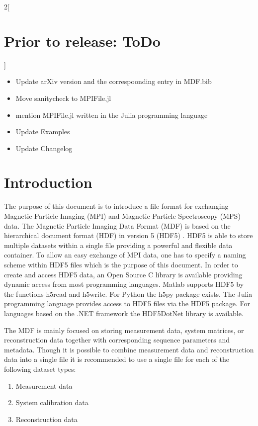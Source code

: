 \documentclass[landscape,a4paper]{article} %
\newcommand{\inlvar}[1]{{\ttfamily#1}}
\begin{document}
\begin{multicols}{2}[\section{Prior to release: ToDo}]		
 \begin{itemize}		
 	\item Update arXiv version and the correspoonding entry in \inlvar{MDF.bib}		
 	\item Move sanitycheck to \inlvar{MPIFile.jl}		
 	\item mention MPIFile.jl written in the Julia programming language \cite{Bezanson2012,Bezanson2014,Bezanson2014a}		
 	\item Update Examples		
 	\item Update Changelog		
 \end{itemize}		


\section{Introduction} \label{Sec:Introduction}

The purpose of this document is to introduce a file format for exchanging Magnetic Particle Imaging (MPI) and Magnetic Particle Spectroscopy (MPS) data. The Magnetic Particle Imaging Data Format (MDF) is based on the hierarchical document format (HDF) in version 5 (HDF5) \cite{hdf5}. HDF5 is able to store multiple datasets within a single file providing a powerful and flexible data container. To allow an easy exchange of MPI data, one has to specify a naming scheme within HDF5 files which is the purpose of this document. In order to create and access HDF5 data, an Open Source C library is available providing dynamic access from most programming languages. Matlab supports HDF5 by the functions \inlvar{h5read} and \inlvar{h5write}. For Python the \inlvar{h5py} package exists. The Julia programming language provides access to HDF5 files via the \inlvar{HDF5} package. For languages based on the .NET framework the \inlvar{HDF5DotNet} library is available.

The MDF is mainly focused on storing measurement data, system matrices, or reconstruction data together with corresponding sequence parameters and metadata. Though it is possible to combine measurement data and reconstruction data into a single file it is recommended to use a single file for each of the following dataset types:
\begin{enumerate}
\setlength{\itemsep}{0pt}
\item Measurement data
\item System calibration data
\item Reconstruction data
\end{enumerate}


\end{multicols}
\end{document}

